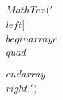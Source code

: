 \documentclass[preview]{standalone}
\begin{document}
\begin{align*}
MathTex('\\left[\\begin{array}{c}\\quad \\\\\\end{array}\\right.')
\end{align*}
\end{document}
